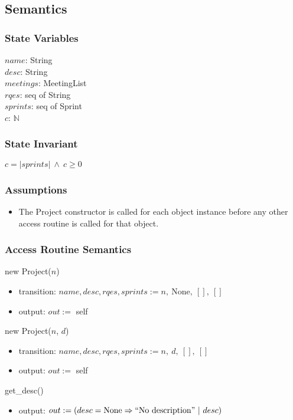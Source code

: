 \documentclass[12pt, titlepage]{article}
\begin{document}
\subsection*{Semantics}
\subsubsection*{State Variables}
$name$: String\\
$desc$: String\\
$meetings$: MeetingList\\
$rqes$: seq of String\\
$sprints$: seq of Sprint\\
$c$: $\mathbb{N}$

\subsubsection*{State Invariant}
$c = |sprints|\ \land\ c \geq 0$ 

\subsubsection*{Assumptions}
\begin{itemize}
  \item The Project constructor is called for each object instance before any other access routine is called for that object.
\end{itemize}

\subsubsection*{Access Routine Semantics}
\noindent new Project($n$)
\begin{itemize}
    \item transition: $name, desc, rqes, sprints := n,\ \text{None},\ [],\ []$
    \item output: $out :=$ self
\end{itemize}

\noindent new Project($n$, $d$)
\begin{itemize}
    \item transition: $name, desc, rqes, sprints := n,\ d,\ [],\ []$
    \item output: $out :=$ self
\end{itemize}

\noindent get\_desc()
\begin{itemize}
    \item output: $out := (desc = \text{None} \Rightarrow ``\text{No description}"\ |\ desc)$
\end{itemize}
\end{document}

